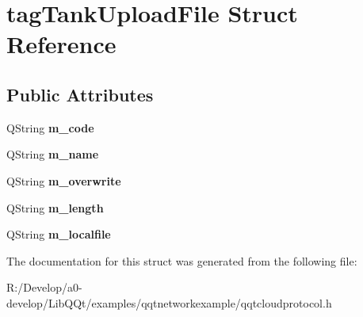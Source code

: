 \hypertarget{structtag_tank_upload_file}{}\section{tag\+Tank\+Upload\+File Struct Reference}
\label{structtag_tank_upload_file}
\subsection*{Public Attributes}
\begin{DoxyCompactItemize}
\item 
\mbox{\label{structtag_tank_upload_file_a5084425e79413a668dda3b116380dbfc}} 
Q\+String {\bfseries m\+\_\+code}
\item 
\mbox{\label{structtag_tank_upload_file_a09e9dbd3bc401a0b8d78b758d9899f7e}} 
Q\+String {\bfseries m\+\_\+name}
\item 
\mbox{\label{structtag_tank_upload_file_a19a444891689fd435e5352a08fe1a455}} 
Q\+String {\bfseries m\+\_\+overwrite}
\item 
\mbox{\label{structtag_tank_upload_file_a073a439e8aaa5cdc465e9208996eff2a}} 
Q\+String {\bfseries m\+\_\+length}
\item 
\mbox{\label{structtag_tank_upload_file_a67d6163163d87a6258c2fc69f49ae60b}} 
Q\+String {\bfseries m\+\_\+localfile}
\end{DoxyCompactItemize}


The documentation for this struct was generated from the following file\+:\begin{DoxyCompactItemize}
\item 
R\+:/\+Develop/a0-\/develop/\+Lib\+Q\+Qt/examples/qqtnetworkexample/qqtcloudprotocol.\+h\end{DoxyCompactItemize}
